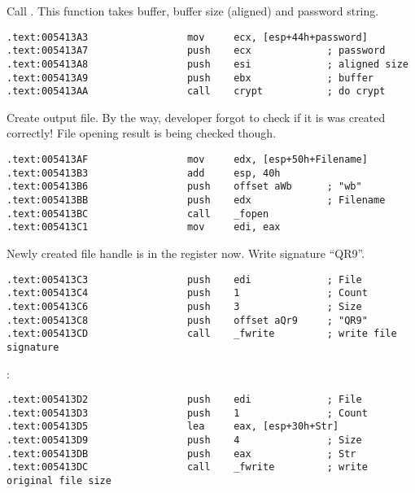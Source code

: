 {Call . This function takes buffer, buffer size (aligned) and password string.}

\begin{lstlisting}
.text:005413A3                 mov     ecx, [esp+44h+password]
.text:005413A7                 push    ecx             ; password
.text:005413A8                 push    esi             ; aligned size
.text:005413A9                 push    ebx             ; buffer
.text:005413AA                 call    crypt           ; do crypt
\end{lstlisting}

{Create output file. By the way, developer forgot to check if it is was created correctly! 
File opening result is being checked though.}

\begin{lstlisting}
.text:005413AF                 mov     edx, [esp+50h+Filename]
.text:005413B3                 add     esp, 40h
.text:005413B6                 push    offset aWb      ; "wb"
.text:005413BB                 push    edx             ; Filename
.text:005413BC                 call    _fopen
.text:005413C1                 mov     edi, eax
\end{lstlisting}

{Newly created file handle is in the \EDI register now. Write signature ``QR9''.}

\begin{lstlisting}
.text:005413C3                 push    edi             ; File
.text:005413C4                 push    1               ; Count
.text:005413C6                 push    3               ; Size
.text:005413C8                 push    offset aQr9     ; "QR9"
.text:005413CD                 call    _fwrite         ; write file signature
\end{lstlisting}

:

\begin{lstlisting}
.text:005413D2                 push    edi             ; File
.text:005413D3                 push    1               ; Count
.text:005413D5                 lea     eax, [esp+30h+Str]
.text:005413D9                 push    4               ; Size
.text:005413DB                 push    eax             ; Str
.text:005413DC                 call    _fwrite         ; write original file size
\end{lstlisting}

